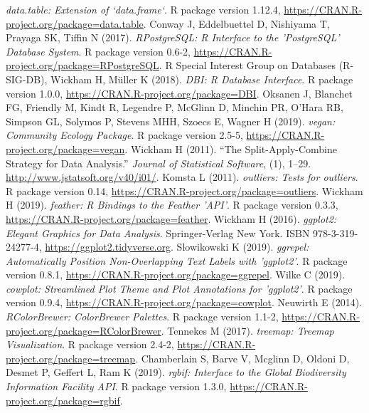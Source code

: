 \documentclass[journal,datadescriptor,accept,moreauthors,pdftex]{Definitions/mdpi}
\begin{document}
\emph{data.table: Extension of `data.frame`}.
R package version 1.12.4, \url{https://CRAN.R-project.org/package=data.table}.
\newline Conway J, Eddelbuettel D, Nishiyama T, Prayaga SK, Tiffin N (2017).
\emph{RPostgreSQL: R Interface to the 'PostgreSQL' Database System}.
R package version 0.6-2, \url{https://CRAN.R-project.org/package=RPostgreSQL}.
\newline R Special Interest Group on Databases (R-SIG-DB), Wickham H, Müller K (2018).
\emph{DBI: R Database Interface}.
R package version 1.0.0, \url{https://CRAN.R-project.org/package=DBI}.
\newline Oksanen J, Blanchet FG, Friendly M, Kindt R, Legendre P, McGlinn D, Minchin PR, O'Hara RB, Simpson GL, Solymos P, Stevens MHH, Szoecs E, Wagner H (2019).
\emph{vegan: Community Ecology Package}.
R package version 2.5-5, \url{https://CRAN.R-project.org/package=vegan}.
\newline Wickham H (2011).
``The Split-Apply-Combine Strategy for Data Analysis.''
\emph{Journal of Statistical Software}, (1), 1--29.
\url{http://www.jstatsoft.org/v40/i01/}.
\newline Komsta L (2011).
\emph{outliers: Tests for outliers}.
R package version 0.14, \url{https://CRAN.R-project.org/package=outliers}.
\newline Wickham H (2019).
\emph{feather: R Bindings to the Feather 'API'}.
R package version 0.3.3, \url{https://CRAN.R-project.org/package=feather}.
\newline Wickham H (2016).
\emph{ggplot2: Elegant Graphics for Data Analysis}.
Springer-Verlag New York.
ISBN 978-3-319-24277-4, \url{https://ggplot2.tidyverse.org}.
\newline Slowikowski K (2019).
\emph{ggrepel: Automatically Position Non-Overlapping Text Labels with
'ggplot2'}.
R package version 0.8.1, \url{https://CRAN.R-project.org/package=ggrepel}.
\newline Wilke C (2019).
\emph{cowplot: Streamlined Plot Theme and Plot Annotations for 'ggplot2'}.
R package version 0.9.4, \url{https://CRAN.R-project.org/package=cowplot}.
\newline Neuwirth E (2014).
\emph{RColorBrewer: ColorBrewer Palettes}.
R package version 1.1-2, \url{https://CRAN.R-project.org/package=RColorBrewer}.
\newline Tennekes M (2017).
\emph{treemap: Treemap Visualization}.
R package version 2.4-2, \url{https://CRAN.R-project.org/package=treemap}.
\newline Chamberlain S, Barve V, Mcglinn D, Oldoni D, Desmet P, Geffert L, Ram K (2019).
\emph{rgbif: Interface to the Global Biodiversity Information Facility API}.
R package version 1.3.0, \url{https://CRAN.R-project.org/package=rgbif}.
\end{document}
